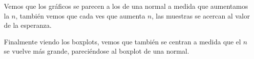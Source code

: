 \documentclass[a4paper]{article}
\begin{document}
	Vemos que los gr\'aficos se parecen a los de una normal a medida que aumentamos la $n$, tambi\'en vemos que cada ves que aumenta $n$, las muestras se acercan al valor de la esperanza.
	
	Finalmente viendo los boxplots, vemos que tambi\'en se centran a medida que el $n$ se vuelve m\'as grande, pareci\'endose al boxplot de una normal.
	
	\begin{figure}[H]
		\centering
		\hfill
	\end{figure}
	
\end{document}
